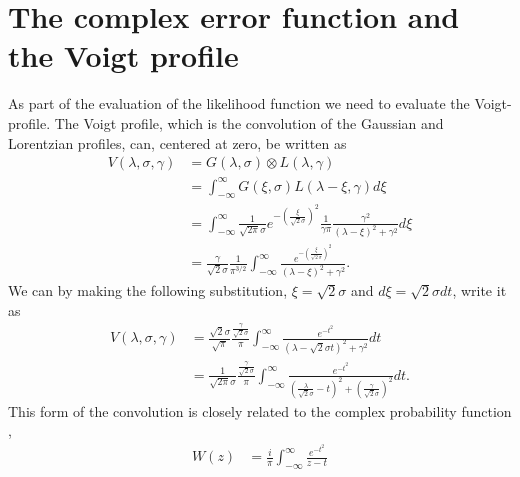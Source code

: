 \documentclass[a4paper,fleqn,usenatbib]{mnras}
\begin{document}

\section{The complex error function and the Voigt profile}
As part of the evaluation of the likelihood function we need to evaluate the Voigt-profile. The Voigt profile, which is the convolution of the Gaussian and Lorentzian profiles, can, centered at zero, be written as \citep{pagnini2010} 
\begin{equation} 
	\begin{split}
		V(\lambda,\sigma, \gamma)  
		& = G(\lambda, \sigma)  \otimes L(\lambda, \gamma) \\
		& = \int_{-\infty}^{\infty} G(\xi, \sigma) L(\lambda - \xi, \gamma) d\xi \\
		& = \int_{-\infty}^{\infty} \frac{1}{\sqrt{2 \pi} \sigma} e^{- \left( \frac{\xi}{\sqrt{2} \sigma}  \right)^2 } \frac{1}{\gamma \pi} \frac{\gamma^2}{(\lambda - \xi)^2 + \gamma^2} d\xi \\
		& = \frac{\gamma}{\sqrt{2} \sigma} \frac{1}{ \pi^{3/2}}   \int_{-\infty}^{\infty} \frac{e^{- \left( \frac{\xi}{\sqrt{2} \sigma}  \right)^2 }}{(\lambda - \xi)^2 + \gamma^2}.
	\end{split}
\end{equation}
We can by making the following substitution, $\xi = \sqrt{2} \sigma$ and $d\xi = \sqrt{2} \sigma dt$, write it as
\begin{equation} 
	\begin{split}
		V(\lambda,\sigma, \gamma)  
		& =  \frac{\sqrt{2} \sigma}{ \sqrt{{\pi}}} \frac{\frac{\gamma}{\sqrt{2} \sigma}}{\pi}  \int_{-\infty}^{\infty} \frac{e^{- t^2 }}{(\lambda - \sqrt{2} \sigma t)^2 + \gamma^2} dt \\
		& = \frac{1}{\sqrt{2 \pi} \sigma}  \frac{\frac{\gamma}{\sqrt{2} \sigma}}{\pi}  \int_{-\infty}^{\infty} \frac{e^{- t^2 }}{\left(\frac{\lambda}{\sqrt{2} \sigma} -  t\right)^2 + \left(\frac{\gamma}{\sqrt{2} \sigma}\right)^2} dt.	
	\end{split}
\end{equation}
This form of the convolution is closely related to the complex probability function \citep{letchworth2007, abrarov2015a},
\begin{equation} 
	\begin{split}
		W(z)  
		& = \frac{i}{\pi} \int_{-\infty}^{\infty} \frac{e^{-t^2}}{z - t}  
	\end{split}
\end{equation}
\end{document}
